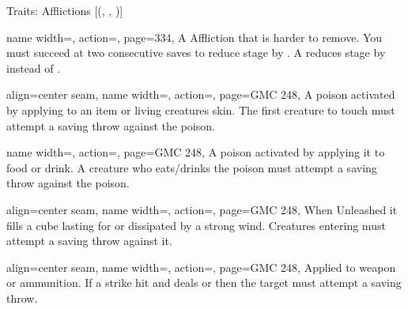 \begin{PageFront}
\begin{Tables}{\frontTableHeight}
\begin{Table}{Traits: Afflictions }[{(, , )}]
\begin{entry}{}{%
                name width=\conditionLength,%
                action=\Virulent,
                page=334,
            }
                A Affliction that is harder to remove.
                You must succeed at two consecutive saves to reduce stage by .
                A  reduces stage by  instead of .
            \end{entry}
            \breakLine
            \begin{entry}{}{%
                align=center seam,
                name width=\conditionLength,%
                action=\Contact,
                page=GMC 248,
            }
                A poison activated by applying to an item or living creatures skin.
                The first creature to touch must attempt a saving throw against the poison.\\
            \end{entry}
            \begin{entry}{}{%
                name width=\conditionLength,%
                action=\Ingested,
                page=GMC 248,
            }
                A poison activated by applying it to food or drink.
                A creature who eats/drinks the poison must attempt a saving throw against the poison.
            \end{entry}
            \begin{entry}{}{%
                align=center seam,
                name width=\conditionLength,%
                action=\Inhaled,
                page=GMC 248,
            }%
                When Unleashed it fills a  cube lasting for  or dissipated by a strong wind.
                Creatures entering must attempt a saving throw against it. \\
            \end{entry}
            \begin{entry}{}{%
                align=center seam,
                name width=\conditionLength,%
                action=\Injury,
                page=GMC 248,
            }
                Applied to weapon or ammunition. If a strike hit and deals  or  then the target must attempt a saving throw. \\
                \hfill
            \end{entry}

\end{Table}
\end{Tables}
\end{PageFront}
